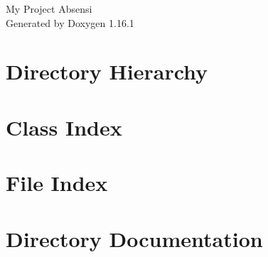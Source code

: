 \documentclass[twoside]{book}
\newcommand{\+}{\discretionary{\mbox{\scriptsize$\hookleftarrow$}}{}{}}
\newcommand{\clearemptydoublepage}{%
    \newpage{\pagestyle{empty}\cleardoublepage}%
  }
\begin{document}
  \raggedbottom
    \hypersetup{pageanchor=false,
                bookmarksnumbered=true,
                pdfencoding=unicode
               }
  \begin{titlepage}
  \vspace*{7cm}
  \begin{center}%
  {\Large My Project Absensi}\\
  \vspace*{1cm}
  {\large Generated by Doxygen 1.16.1}\\
  \end{center}
  \end{titlepage}
  \clearemptydoublepage
  \tableofcontents
  \clearemptydoublepage
  \hypersetup{pageanchor=true}
\chapter{Directory Hierarchy}

\chapter{Class Index}

\chapter{File Index}

\chapter{Directory Documentation}





















\end{document}
